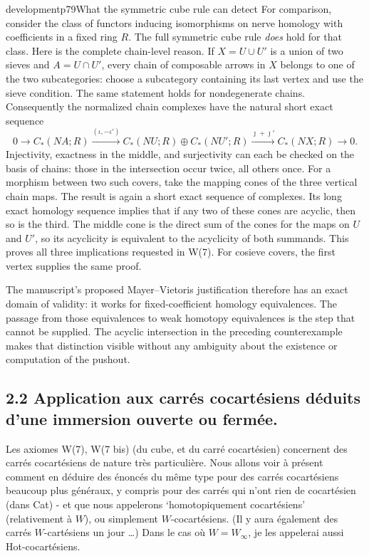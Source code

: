 \begin{dcomment}{development}{p79}{What the symmetric cube rule can detect}
For comparison, consider the class of functors inducing isomorphisms on nerve homology with coefficients in a fixed ring $R$. The full symmetric cube rule \emph{does} hold for that class. Here is the complete chain-level reason. If $X=U\cup U'$ is a union of two sieves and $A=U\cap U'$, every chain of composable arrows in $X$ belongs to one of the two subcategories: choose a subcategory containing its last vertex and use the sieve condition. The same statement holds for nondegenerate chains. Consequently the normalized chain complexes have the natural short exact sequence
\[
0\longrightarrow C_*(NA;R)
 \xrightarrow{(\iota,-\iota')}
 C_*(NU;R)\oplus C_*(NU';R)
 \xrightarrow{\jmath+\jmath'} C_*(NX;R)
 \longrightarrow0.
\]
Injectivity, exactness in the middle, and surjectivity can each be checked on the basis of chains: those in the intersection occur twice, all others once. For a morphism between two such covers, take the mapping cones of the three vertical chain maps. The result is again a short exact sequence of complexes. Its long exact homology sequence implies that if any two of these cones are acyclic, then so is the third. The middle cone is the direct sum of the cones for the maps on $U$ and $U'$, so its acyclicity is equivalent to the acyclicity of both summands. This proves all three implications requested in W(7). For cosieve covers, the first vertex supplies the same proof.

The manuscript's proposed Mayer--Vietoris justification therefore has an exact domain of validity: it works for fixed-coefficient homology equivalences. The passage from those equivalences to weak homotopy equivalences is the step that cannot be supplied. The acyclic intersection in the preceding counterexample makes that distinction visible without any ambiguity about the existence or computation of the pushout.
\end{dcomment}


\subsection*{2.2 Application aux carrés cocartésiens déduits d’une immersion ouverte ou fermée.}

Les axiomes W(7), W(7 bis) (du cube, et du carré cocartésien) concernent des carrés cocartésiens de nature très particulière. Nous allons voir à présent comment en déduire des énoncés du même type pour des carrés cocartésiens beaucoup plus généraux, y compris pour des carrés qui n’ont rien de cocartésien (dans Cat) - et que nous appelerons %
‘homotopiquement cocartésiens’ (relativement à $W$), ou simplement $W$-cocartésiens. (Il y aura également des carrés $W$-cartésiens un jour \dots) Dans le cas où $W=W_\infty$, je les appelerai aussi Hot-cocartésiens. %

